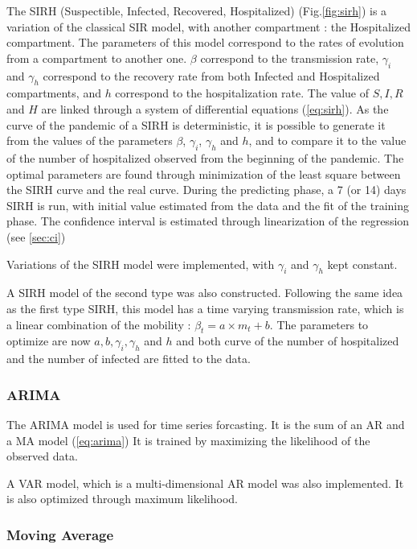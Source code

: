 The SIRH (Suspectible, Infected, Recovered, Hospitalized) (Fig.\ref{fig:sirh}) is a variation of the classical SIR model, with another compartment : the Hospitalized compartment. 
The parameters of this model correspond to the rates of evolution from a compartment to another one. 
$\beta$ correspond to the transmission rate, $\gamma_i$ and $\gamma_h$ correspond to the recovery rate from both Infected and Hospitalized compartments, and $h$ correspond to the hospitalization rate. 
The value of $S, I, R$ and $H$ are linked through a system of differential equations (\ref{eq:sirh}). 
As the curve of the pandemic of a SIRH is deterministic, it is possible to generate it from the values of the parameters $\beta$, $\gamma_i$, $\gamma_h$ and $h$, and to compare it to the value of the number of hospitalized observed from the beginning of the pandemic.
The optimal parameters are found through minimization of the least square between the SIRH curve and the real curve. 
During the predicting phase, a 7 (or 14) days SIRH is run, with initial value estimated from the data and the fit of the training phase.
The confidence interval is estimated through linearization of the regression (see \ref{sec:ci})

Variations of the SIRH model were implemented, with $\gamma_i$ and $\gamma_h$ kept constant. 

A SIRH model of the second type was also constructed. 
Following the same idea as the first type SIRH, this model has a time varying transmission rate, which is a linear combination of the mobility : $\beta_t = a \times m_t + b$. 
The parameters to optimize are now $a, b, \gamma_i, \gamma_h$ and $h$ and both curve of the number of hospitalized and the number of infected are fitted to the data. 


\subsubsection{ARIMA}

The ARIMA model is used for time series forcasting. 
It is the sum of an AR and a MA model (\ref{eq:arima})
It is trained by maximizing the likelihood of the observed data. 

A VAR model, which is a multi-dimensional AR model was also implemented. 
It is also optimized through maximum likelihood. 

\subsubsection{Moving Average}

